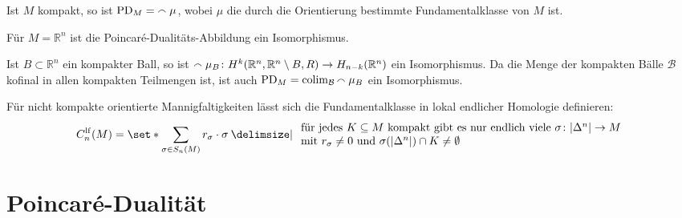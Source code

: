 \begin{bemerkung}
	Ist $M$ kompakt, so ist $\operatorname{PD}_M= {\smallfrown \mu}$, wobei $\mu$ die durch die Orientierung bestimmte Fundamentalklasse von $M$ ist.
\end{bemerkung}

\begin{lemma}
	Für $M=\mathbb{R}^n$ ist die Poincaré-Dualitäts-Abbildung ein Isomorphismus. 
\end{lemma}
\begin{beweis}
	Ist $B \subset \mathbb{R}^n$ ein kompakter Ball, so ist ${\smallfrown\mu_B} \colon H^k(\mathbb{R}^n,\mathbb{R}^n \setminus B,R) \to H_{n-k}(\mathbb{R}^n)$ ein Isomorphismus.
	Da die Menge der kompakten Bälle $\mathcal{B}$ kofinal in allen kompakten Teilmengen ist, ist auch
	\(
		\operatorname{PD}_M = \operatorname*{colim}_{\mathcal{B}} {\smallfrown \mu_B}
	\)
	ein Isomorphismus.
\end{beweis}

\begin{bemerkung}
	Für nicht kompakte orientierte Mannigfaltigkeiten lässt sich die Fundamentalklasse in lokal endlicher Homologie definieren: 
	\[
		C^\lf_{n}(M) = \set*{\sum_{\sigma\in S_n(M)} r_\sigma \cdot \sigma \given \begin{array}{l}
			\text{für jedes $K \subseteq M$ kompakt gibt es nur endlich viele $\sigma \colon \abs*{\Delta^n} \to M$} \\
			\text{mit $r_\sigma\neq 0$ und $\sigma(\abs*{\Delta^n}) \cap K \neq \emptyset$} 
		\end{array}
		  }
	\]
\end{bemerkung}
\newpage

\section{Poincaré-Dualität} %
\label{sec:8}


